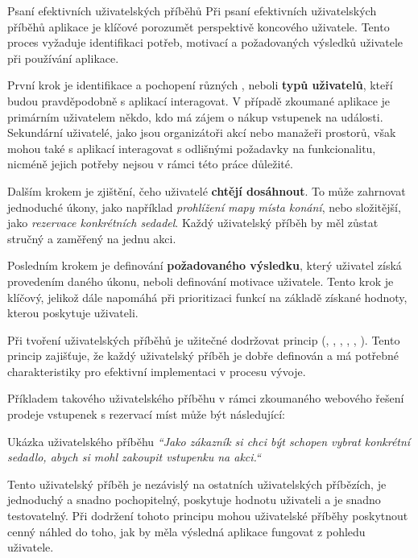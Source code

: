 \begin{subsection}{Psaní efektivních uživatelských příběhů}
    \label{subsec:navrh-ui-uzivatelske-pribehy-psani-efektivnich}
    Při psaní efektivních uživatelských příběhů aplikace je klíčové porozumět perspektivě koncového uživatele.
    Tento proces vyžaduje identifikaci potřeb, motivací a požadovaných výsledků uživatele při používání aplikace.

    První krok je identifikace a pochopení různých , neboli \textbf{typů uživatelů}, kteří budou pravděpodobně s aplikací interagovat.
    V případě zkoumané aplikace je primárním uživatelem někdo, kdo má zájem o nákup vstupenek na události.
    Sekundární uživatelé, jako jsou organizátoři akcí nebo manažeři prostorů, však mohou také s aplikací interagovat s odlišnými požadavky na funkcionalitu, nicméně jejich potřeby nejsou v rámci této práce důležité.

    Dalším krokem je zjištění, čeho uživatelé \textbf{chtějí dosáhnout}.
    To může zahrnovat jednoduché úkony, jako například \textit{prohlížení mapy místa konání}, nebo složitější, jako \textit{rezervace konkrétních sedadel}.
    Každý uživatelský příběh by měl zůstat stručný a zaměřený na jednu akci.

    Posledním krokem je definování \textbf{požadovaného výsledku}, který uživatel získá provedením daného úkonu, neboli definování motivace uživatele.
    Tento krok je klíčový, jelikož dále napomáhá při prioritizaci funkcí na základě získané hodnoty, kterou poskytuje uživateli.

    Při tvoření uživatelských příběhů je užitečné dodržovat princip  (, , , , , ).
    Tento princip zajišťuje, že každý uživatelský příběh je dobře definován a má potřebné charakteristiky pro efektivní implementaci v procesu vývoje\cite{w_glossary_invest}.

    Příkladem takového uživatelského příběhu v rámci zkoumaného webového řešení prodeje vstupenek s rezervací míst může být následující:

    \begin{gray-box}{Ukázka uživatelského příběhu}
        \textit{``Jako zákazník si chci být schopen vybrat konkrétní sedadlo, abych si mohl zakoupit vstupenku na akci.``}
    \end{gray-box}

    Tento uživatelský příběh je nezávislý na ostatních uživatelských příbězích, je jednoduchý a snadno pochopitelný, poskytuje hodnotu uživateli a je snadno testovatelný.
    Při dodržení tohoto principu mohou uživatelské příběhy poskytnout cenný náhled do toho, jak by měla výsledná aplikace fungovat z pohledu uživatele.
\end{subsection}

